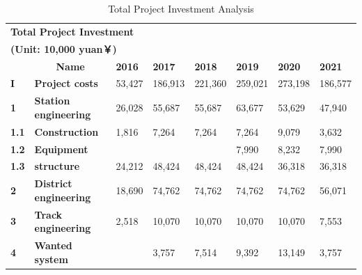 \documentclass[12pt]{article}
\begin{document}
\begin{table}[htbp]
\small
  \centering
  \caption{Total Project Investment Analysis}
    \begin{tabular}{l|l|l|l|l|l|l|l}
    \multicolumn{8}{|p{22.28em}}{\textbf{Total Project Investment}} \\
    \multicolumn{8}{l}{\textbf{(Unit: 10,000 yuan￥)}} \\
    \rowcolor[rgb]{ .929,  .49,  .192} \multicolumn{1}{p{1em}|}{\textcolor[rgb]{ 1,  1,  1}{\textbf{k}}} & \multicolumn{1}{c|}{\textcolor[rgb]{ 1,  1,  1}{\textbf{Name}}} & \textcolor[rgb]{ 1,  1,  1}{\textbf{2016}} & \textcolor[rgb]{ 1,  1,  1}{\textbf{2017}} & \textcolor[rgb]{ 1,  1,  1}{\textbf{2018}} & \textcolor[rgb]{ 1,  1,  1}{\textbf{2019}} & \textcolor[rgb]{ 1,  1,  1}{\textbf{2020}} & \textcolor[rgb]{ 1,  1,  1}{\textbf{2021}} \\
    \hline
    \rowcolor[rgb]{ .973,  .796,  .678} \textbf{I} & \textbf{Project costs} &      53,427  &    186,913  &             221,360  &    259,021  &    273,198  &    186,577  \\
    \hline
    \rowcolor[rgb]{ .988,  .894,  .839} \textbf{1} & \textbf{Station engineering} &      26,028  &      55,687  &               55,687  &      63,677  &      53,629  &      47,940  \\
    \hline
    \rowcolor[rgb]{ .973,  .796,  .678} \textbf{1.1} & \textbf{Construction } &        1,816  &        7,264  &                 7,264  &        7,264  &        9,079  &        3,632  \\
    \hline
    \rowcolor[rgb]{ .988,  .894,  .839} \textbf{1.2} & \textbf{Equipment} &       &       &       &        7,990  &        8,232  &        7,990  \\
    \hline
    \rowcolor[rgb]{ .973,  .796,  .678} \textbf{1.3} & \textbf{structure} &      24,212  &      48,424  &               48,424  &      48,424  &      36,318  &      36,318  \\
    \hline
    \rowcolor[rgb]{ .988,  .894,  .839} \textbf{2} & \textbf{District engineering} &      18,690  &      74,762  &               74,762  &      74,762  &      74,762  &      56,071  \\
    \hline
    \rowcolor[rgb]{ .973,  .796,  .678} \textbf{3} & \textbf{Track engineering} &        2,518  &      10,070  &               10,070  &      10,070  &      10,070  &        7,553  \\
    \hline
    \rowcolor[rgb]{ .988,  .894,  .839} \textbf{4} & \textbf{Wanted system} &       &        3,757  &                 7,514  &        9,392  &      13,149  &        3,757  \\

\end{tabular}
\end{table}
\end{document}
